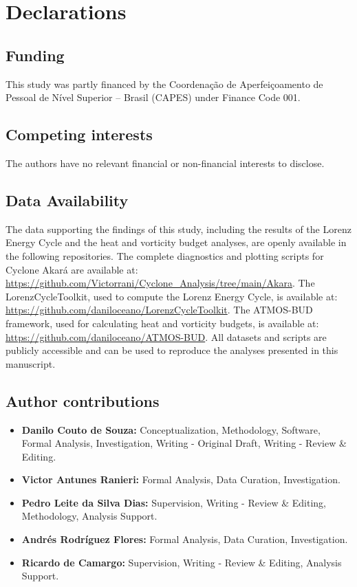 \documentclass[pdflatex,sn-chicago]{sn-jnl}%
\theoremstyle{plain}
\theoremstyle{definition}
\theoremstyle{remark}
\theoremstyle{definition}
\begin{document}

\section*{Declarations}

\subsection*{Funding}

This study was partly financed by the Coordenação de Aperfeiçoamento de Pessoal de Nível Superior – Brasil (CAPES) under Finance Code 001.

\subsection*{Competing interests}

The authors have no relevant financial or non-financial interests to disclose.

\subsection*{Data Availability}

The data supporting the findings of this study, including the results of the Lorenz Energy Cycle and the heat and vorticity budget analyses, are openly available in the following repositories. The complete diagnostics and plotting scripts for Cyclone Akará are available at: \url{https://github.com/Victorrani/Cyclone_Analysis/tree/main/Akara}. The LorenzCycleToolkit, used to compute the Lorenz Energy Cycle, is available at: \url{https://github.com/daniloceano/LorenzCycleToolkit}. The ATMOS-BUD framework, used for calculating heat and vorticity budgets, is available at: \url{https://github.com/daniloceano/ATMOS-BUD}. All datasets and scripts are publicly accessible and can be used to reproduce the analyses presented in this manuscript.

\subsection*{Author contributions}

\begin{itemize} \item \textbf{Danilo Couto de Souza:} Conceptualization, Methodology, Software, Formal Analysis, Investigation, Writing - Original Draft, Writing - Review \& Editing. \item \textbf{Victor Antunes Ranieri:} Formal Analysis, Data Curation, Investigation.  \item \textbf{Pedro Leite da Silva Dias:} Supervision, Writing - Review \& Editing, Methodology, Analysis Support. \item \textbf{Andrés Rodríguez Flores:} Formal Analysis, Data Curation, Investigation. \item \textbf{Ricardo de Camargo:} Supervision, Writing - Review \& Editing, Analysis Support. \end{itemize}
\end{document}
